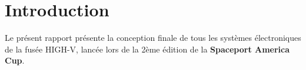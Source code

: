 \chapter{Introduction}
\label{chap:intro}

Le présent rapport présente la conception finale de tous les systèmes
électroniques de la fusée HIGH-V, lancée lors de la 2ème édition de la
\textbf{Spaceport America Cup}. 
